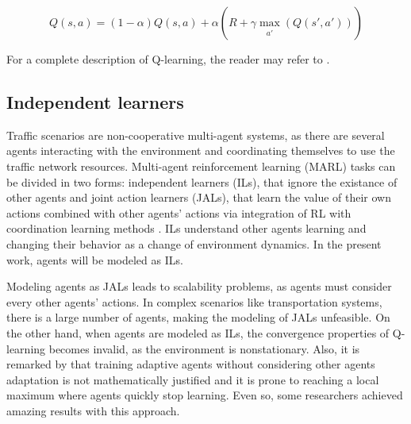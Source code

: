 \documentclass[12pt]{llncs}
\begin{document}
\begin{equation}
\label{eq:qlearning}
Q(s,a) = (1 - \alpha) Q(s,a) + \alpha (R + \gamma \max_{\substack{a'}}(Q(s',a')))
\end{equation}

For a complete description of Q-learning, the reader may refer to \cite{Watkins&Dayan1992}.



\subsection{Independent learners} 
Traffic scenarios are non-cooperative multi-agent systems, as there are several agents interacting with the environment and coordinating themselves to use the traffic network resources. Multi-agent reinforcement learning (MARL) tasks can be divided in two forms: independent learners (ILs), that ignore the existance of other agents and joint action learners (JALs), that learn the value of their own actions combined with other agents' actions via integration of RL with coordination learning methods \cite{Claus&Boutilier1998}. ILs understand other agents learning and changing their behavior as a change of environment dynamics. In the present work, agents will be modeled as ILs.

Modeling agents as JALs leads to scalability problems, as agents must consider every other agents' actions. In complex scenarios like transportation systems, there is a large number of agents, making the modeling of JALs unfeasible. On the other hand, when agents are modeled as ILs, the convergence properties of Q-learning becomes invalid, as the environment is nonstationary. Also, it is remarked by \cite{Littman1994} that training adaptive agents without considering other agents adaptation is not mathematically justified and it is prone to reaching a local maximum where agents quickly stop learning. Even so, some researchers achieved amazing results with this approach.
\end{document}
